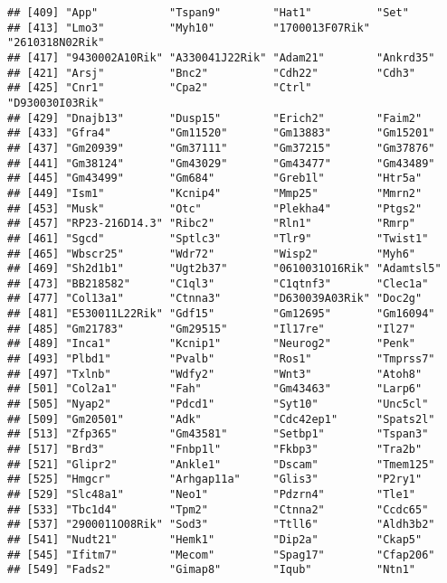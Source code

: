 \documentclass[
]{article}
\begin{document}
\begin{verbatim}
## [409] "App"           "Tspan9"        "Hat1"          "Set"          
## [413] "Lmo3"          "Myh10"         "1700013F07Rik" "2610318N02Rik"
## [417] "9430002A10Rik" "A330041J22Rik" "Adam21"        "Ankrd35"      
## [421] "Arsj"          "Bnc2"          "Cdh22"         "Cdh3"         
## [425] "Cnr1"          "Cpa2"          "Ctrl"          "D930030I03Rik"
## [429] "Dnajb13"       "Dusp15"        "Erich2"        "Faim2"        
## [433] "Gfra4"         "Gm11520"       "Gm13883"       "Gm15201"      
## [437] "Gm20939"       "Gm37111"       "Gm37215"       "Gm37876"      
## [441] "Gm38124"       "Gm43029"       "Gm43477"       "Gm43489"      
## [445] "Gm43499"       "Gm684"         "Greb1l"        "Htr5a"        
## [449] "Ism1"          "Kcnip4"        "Mmp25"         "Mmrn2"        
## [453] "Musk"          "Otc"           "Plekha4"       "Ptgs2"        
## [457] "RP23-216D14.3" "Ribc2"         "Rln1"          "Rmrp"         
## [461] "Sgcd"          "Sptlc3"        "Tlr9"          "Twist1"       
## [465] "Wbscr25"       "Wdr72"         "Wisp2"         "Myh6"         
## [469] "Sh2d1b1"       "Ugt2b37"       "0610031O16Rik" "Adamtsl5"     
## [473] "BB218582"      "C1ql3"         "C1qtnf3"       "Clec1a"       
## [477] "Col13a1"       "Ctnna3"        "D630039A03Rik" "Doc2g"        
## [481] "E530011L22Rik" "Gdf15"         "Gm12695"       "Gm16094"      
## [485] "Gm21783"       "Gm29515"       "Il17re"        "Il27"         
## [489] "Inca1"         "Kcnip1"        "Neurog2"       "Penk"         
## [493] "Plbd1"         "Pvalb"         "Ros1"          "Tmprss7"      
## [497] "Txlnb"         "Wdfy2"         "Wnt3"          "Atoh8"        
## [501] "Col2a1"        "Fah"           "Gm43463"       "Larp6"        
## [505] "Nyap2"         "Pdcd1"         "Syt10"         "Unc5cl"       
## [509] "Gm20501"       "Adk"           "Cdc42ep1"      "Spats2l"      
## [513] "Zfp365"        "Gm43581"       "Setbp1"        "Tspan3"       
## [517] "Brd3"          "Fnbp1l"        "Fkbp3"         "Tra2b"        
## [521] "Glipr2"        "Ankle1"        "Dscam"         "Tmem125"      
## [525] "Hmgcr"         "Arhgap11a"     "Glis3"         "P2ry1"        
## [529] "Slc48a1"       "Neo1"          "Pdzrn4"        "Tle1"         
## [533] "Tbc1d4"        "Tpm2"          "Ctnna2"        "Ccdc65"       
## [537] "2900011O08Rik" "Sod3"          "Ttll6"         "Aldh3b2"      
## [541] "Nudt21"        "Hemk1"         "Dip2a"         "Ckap5"        
## [545] "Ifitm7"        "Mecom"         "Spag17"        "Cfap206"      
## [549] "Fads2"         "Gimap8"        "Iqub"          "Ntn1"         

\end{verbatim}
\end{document}
